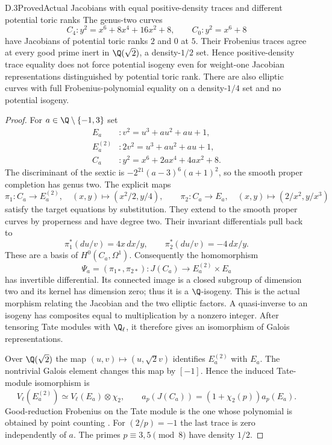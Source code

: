 \begin{statement}{D.3}{Proved}{Actual Jacobians with equal positive-density traces and different potential toric ranks}
The genus-two curves
\[
 C_4:y^2=x^6+8x^4+16x^2+8,
 \qquad C_0:y^2=x^6+8
 \tag{D.3.1}
\]
have Jacobians of potential toric ranks $2$ and $0$ at $5$.
Their Frobenius traces agree at every good prime inert in
$\Q(\sqrt2)$, a density-$1/2$ set. Hence positive-density trace
equality does not force potential isogeny even for weight-one
Jacobian representations distinguished by potential toric rank.
There are also elliptic curves with full Frobenius-polynomial
equality on a density-$1/4$ set and no potential isogeny.
\end{statement}
\begin{proof}
For $a\in\Q\setminus\{-1,3\}$ set
\[
 \begin{split}
 E_a &: v^2=u^3+a u^2+a u+1,\\
 E_a^{(2)} &: 2v^2=u^3+a u^2+a u+1,\\
 C_a &: y^2=x^6+2a x^4+4a x^2+8.
 \end{split}
\]
The discriminant of the sextic is
$-2^{21}(a-3)^6(a+1)^2$, so the smooth proper completion has
genus two. The explicit maps
\[
 \pi_1:C_a\longrightarrow E_a^{(2)},\quad
 (x,y)\longmapsto(x^2/2,y/4),
 \qquad
 \pi_2:C_a\longrightarrow E_a,\quad
 (x,y)\longmapsto(2/x^2,y/x^3)
 \tag{D.3.2}
\]
satisfy the target equations by substitution. They extend to
the smooth proper curves by properness and have degree two.
Their invariant differentials pull back to
\[
 \pi_1^*(du/v)=4x\,dx/y,
 \qquad
 \pi_2^*(du/v)=-4\,dx/y.
\]
These are a basis of $H^0(C_a,\Omega^1)$. Consequently the
homomorphism
\[
 \Psi_a=(\pi_{1*},\pi_{2*}):J(C_a)\longrightarrow
 E_a^{(2)}\times E_a
 \tag{D.3.3}
\]
has invertible differential. Its connected image is a closed
subgroup of dimension two and its kernel has dimension zero;
thus it is a $\Q$-isogeny. This is the actual morphism relating
the Jacobian and the two elliptic factors. A quasi-inverse to
an isogeny has composites equal to multiplication by a nonzero
integer. After tensoring Tate modules with $\Q_\ell$, it
therefore gives an isomorphism of Galois representations.

Over $\Q(\sqrt2)$ the map $(u,v)\mapsto(u,\sqrt2v)$ identifies
$E_a^{(2)}$ with $E_a$. The nontrivial Galois element changes
this map by $[-1]$. Hence the induced Tate-module isomorphism
is
\[
 V_\ell(E_a^{(2)})\simeq V_\ell(E_a)\otimes\chi_2,
 \qquad
 a_p(J(C_a))=(1+\chi_2(p))a_p(E_a).
 \tag{D.3.4}
\]
Good-reduction Frobenius on the Tate module is the one whose
polynomial is obtained by point counting
\cite[V, Propositions 8.1 and 8.3]{AgentMilneEC}.
For $(2/p)=-1$ the last trace is zero independently of $a$.
The primes $p\equiv3,5\pmod8$ have density $1/2$.


\end{proof}
